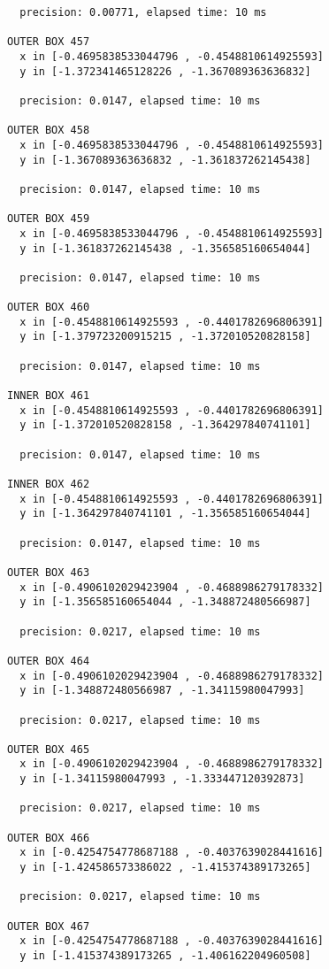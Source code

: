 \begin{verbatim}
  precision: 0.00771, elapsed time: 10 ms

OUTER BOX 457
  x in [-0.4695838533044796 , -0.4548810614925593]
  y in [-1.372341465128226 , -1.367089363636832]

  precision: 0.0147, elapsed time: 10 ms

OUTER BOX 458
  x in [-0.4695838533044796 , -0.4548810614925593]
  y in [-1.367089363636832 , -1.361837262145438]

  precision: 0.0147, elapsed time: 10 ms

OUTER BOX 459
  x in [-0.4695838533044796 , -0.4548810614925593]
  y in [-1.361837262145438 , -1.356585160654044]

  precision: 0.0147, elapsed time: 10 ms

OUTER BOX 460
  x in [-0.4548810614925593 , -0.4401782696806391]
  y in [-1.379723200915215 , -1.372010520828158]

  precision: 0.0147, elapsed time: 10 ms

INNER BOX 461
  x in [-0.4548810614925593 , -0.4401782696806391]
  y in [-1.372010520828158 , -1.364297840741101]

  precision: 0.0147, elapsed time: 10 ms

INNER BOX 462
  x in [-0.4548810614925593 , -0.4401782696806391]
  y in [-1.364297840741101 , -1.356585160654044]

  precision: 0.0147, elapsed time: 10 ms

OUTER BOX 463
  x in [-0.4906102029423904 , -0.4688986279178332]
  y in [-1.356585160654044 , -1.348872480566987]

  precision: 0.0217, elapsed time: 10 ms

OUTER BOX 464
  x in [-0.4906102029423904 , -0.4688986279178332]
  y in [-1.348872480566987 , -1.34115980047993]

  precision: 0.0217, elapsed time: 10 ms

OUTER BOX 465
  x in [-0.4906102029423904 , -0.4688986279178332]
  y in [-1.34115980047993 , -1.333447120392873]

  precision: 0.0217, elapsed time: 10 ms

OUTER BOX 466
  x in [-0.4254754778687188 , -0.4037639028441616]
  y in [-1.424586573386022 , -1.415374389173265]

  precision: 0.0217, elapsed time: 10 ms

OUTER BOX 467
  x in [-0.4254754778687188 , -0.4037639028441616]
  y in [-1.415374389173265 , -1.406162204960508]


\end{verbatim}
